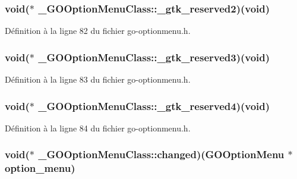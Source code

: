 \subsubsection[{\_\-gtk\_\-reserved2}]{\setlength{\rightskip}{0pt plus 5cm}void($\ast$ {\bf \_\-GOOptionMenuClass::\_\-gtk\_\-reserved2})(void)}\label{struct__GOOptionMenuClass_a9ff5814c5f7fb4b1c9a0852cb28ea20d}


Définition à la ligne 82 du fichier go-\/optionmenu.h.

\subsubsection[{\_\-gtk\_\-reserved3}]{\setlength{\rightskip}{0pt plus 5cm}void($\ast$ {\bf \_\-GOOptionMenuClass::\_\-gtk\_\-reserved3})(void)}\label{struct__GOOptionMenuClass_aba4dacc408690d2859239cb1cf5b8898}


Définition à la ligne 83 du fichier go-\/optionmenu.h.

\subsubsection[{\_\-gtk\_\-reserved4}]{\setlength{\rightskip}{0pt plus 5cm}void($\ast$ {\bf \_\-GOOptionMenuClass::\_\-gtk\_\-reserved4})(void)}\label{struct__GOOptionMenuClass_a7d79a49597ce23d1409d2f8f04202949}


Définition à la ligne 84 du fichier go-\/optionmenu.h.

\subsubsection[{changed}]{\setlength{\rightskip}{0pt plus 5cm}void($\ast$ {\bf \_\-GOOptionMenuClass::changed})({\bf GOOptionMenu} $\ast$option\_\-menu)}\label{struct__GOOptionMenuClass_a6946b4aaac181ea6993f266657827751}


